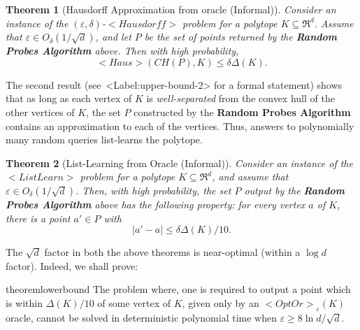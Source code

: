 \documentclass[11pt,letterpaper]{article}
\def\mathsf#1{<#1>}%
\def\xspace{}%
\def\Cref#1{<Label:#1>}%
\newtheorem{theorem}{Theorem}[section]
\theoremstyle{definition}
\theoremstyle{remark}
\newcommand{\Haus}{{\mathsf{Haus}}}
\newcommand{\ListLearn}{\mathsf {ListLearn}\xspace}
\newcommand{\Hausdorf}{\mathsf {Hausdorff}\xspace }
\newcommand{\opto}{{\mathsf{OptOr}}}
\begin{document}
\begin{theorem} 
[Hausdorff Approximation from oracle (Informal)]
\label{hausdorf-0}
Consider an instance of the $(\varepsilon, \delta)$-$\Hausdorf$ problem for a polytope $K \subseteq \Re^d$. Assume  that
$\varepsilon\in O_\delta(1/\sqrt d)$, and let $P$ be the set of points returned by the {\bf Random Probes Algorithm} above. 
Then with high probability, 
$$ \Haus(CH(P),K)\leq \delta\Delta(K).$$
\end{theorem}

The second result (see~\Cref{upper-bound-2} for a formal statement) shows that as long as each vertex of $K$ is {\em well-separated} from the convex hull of the other vertices of $K$, the set $P$ constructed by the {\bf Random Probes Algorithm} contains an approximation to each of the vertices. Thus, answers to polynomially many random queries list-learns the polytope.  


\begin{theorem}[List-Learning from Oracle (Informal)]\label{list-0}
Consider an instance of  the $\ListLearn$ problem for a polytope $K \subseteq \Re^d$, and assume that  
  $\varepsilon\in O_\delta(1/\sqrt d)$. Then, with high probability, the set $P$ output by the {\bf Random Probes  Algorithm} above has the following property:
for every vertex $a$ of $K$, there is a point $a'\in P$ with
$$|a'-a|\leq \delta\Delta(K)/10.$$
\end{theorem}

The $\sqrt d$ factor in both the above theorems is near-optimal (within a $\log d$ factor). Indeed, we shall prove:

\begin{restatable}{theorem}{lowerbound}
\label{lower-bound-0}
The problem where, one is required to output a point which is within $\Delta (K)/10$ of some vertex of $K$, given only by an $\opto_\varepsilon(K)$ oracle,  cannot be solved in deterministic polynomial time when $\varepsilon\geq 8\ln d/\sqrt d$.
\end{restatable}
\end{document}
